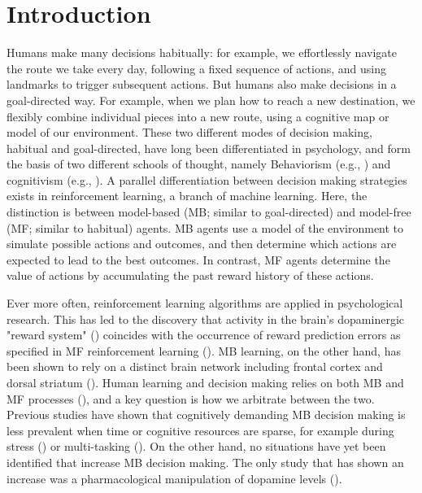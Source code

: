 \documentclass[11pt]{article} %
\begin{document}
\startmain

\section{Introduction}

Humans make many decisions habitually: for example, we effortlessly navigate the route we take every day, following a fixed sequence of actions, and using landmarks to trigger subsequent actions. But humans also make decisions in a goal-directed way. For example, when we plan how to reach a new destination, we flexibly combine individual pieces into a new route, using a cognitive map or model of our environment. These two different modes of decision making, habitual and goal-directed, have long been differentiated in psychology, and form the basis of two different schools of thought, namely Behaviorism (e.g., \cite{skinner_why_1977}) and cognitivism (e.g., \cite{tolman_cognitive_1948}). A parallel differentiation between decision making strategies exists in reinforcement learning, a branch of machine learning. Here, the distinction is between model-based (MB; similar to goal-directed) and model-free (MF; similar to habitual) agents. MB agents use a model of the environment to simulate possible actions and outcomes, and then determine which actions are expected to lead to the best outcomes. In contrast, MF agents determine the value of actions by accumulating the past reward history of these actions.

Ever more often, reinforcement learning algorithms are applied in psychological research. This has led to the discovery that activity in the brain's dopaminergic "reward system" (\cite{wise_brain_1989}) coincides with the occurrence of reward prediction errors as specified in MF reinforcement learning (\cite{schultz_neural_1997}). MB learning, on the other hand, has been shown to rely on a distinct brain network including frontal cortex and dorsal striatum (\cite{dolan_goals_2013}). Human learning and decision making relies on both MB and MF processes (\cite{daw_model-based_2011}), and a key question is how we arbitrate between the two. Previous studies have shown that cognitively demanding MB decision making is less prevalent when time or cognitive resources are sparse, for example during stress (\cite{schwabe_stress-induced_2011}) or multi-tasking (\cite{otto_curse_2013}). On the other hand, no situations have yet been identified that increase MB decision making. The only study that has shown an increase was a pharmacological manipulation of dopamine levels (\cite{wunderlich_dopamine_2012}). 
\end{document}
